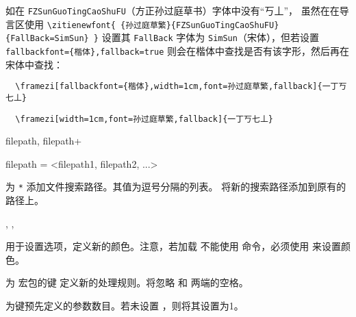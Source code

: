 \documentclass{ctxdoc}
\begin{document}
如在 \verb|FZSunGuoTingCaoShuFU|（方正孙过庭草书）字体中没有“丂丄”，
虽然在在导言区使用 \verb|\zitienewfont{ {孙过庭草繁}{FZSunGuoTingCaoShuFU}{FallBack=SimSun} }| 设置其 \verb|FallBack| 字体为 \verb|SimSun|（宋体），但若设置 \verb|fallbackfont={楷体},fallback=true| 则会在楷体中查找是否有该字形，然后再在宋体中查找：

\begin{verbatim}
  \framezi[fallbackfont={楷体},width=1cm,font=孙过庭草繁,fallback]{一丁丂七丄}
\end{verbatim}

\begin{verbatim}
  \framezi[width=1cm,font=孙过庭草繁,fallback]{一丁丂七丄}
\end{verbatim}

\begin{function}{
  filepath,
  filepath+
}
  \begin{syntax}
    filepath = <filepath1, filepath2, ...>
  \end{syntax}
   为 \verb|*| 添加文件搜索路径。其值为逗号分隔的列表。
   将新的搜索路径添加到原有的路径上。
\end{function}

\begin{function}{
  \zitiesetup,
  \zitiecolorlet,
}
  \begin{syntax}
     
       
  \end{syntax}
  用于设置选项，定义新的颜色。注意，若加载  不能使用 命令，必须使用  来设置颜色。
\end{function}

\begin{function}{\zitienewrule}
  \begin{syntax}
        
  \end{syntax}
  为  宏包的键  定义新的处理规则。将忽略  和  两端的空格。

   为键预先定义的参数数目。若未设置 ，则将其设置为1。
\end{function}
\end{document}
